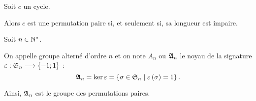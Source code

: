 \begin{ex}[Piège]
Soit \(c\) un cycle.

Alors \(c\) est une permutation paire si, et seulement si, sa longueur est impaire.
\end{ex}

\begin{defi}
Soit \(n\in\mathbb{N}^*\).

On appelle groupe alterné d'ordre \(n\) et on note \(A_n\) ou \(\frak{A}_{n}\) le noyau de la signature \(\varepsilon:\frak{S}_{n}\longrightarrow\left\lbrace-1;1\right\rbrace\) : \[\frak{A}_{n}=\ker\varepsilon=\left\lbrace\sigma\in\frak{S}_{n}\;\middle|\;\varepsilon\left(\sigma\right)=1\right\rbrace.\]

Ainsi, \(\frak{A}_{n}\) est le groupe des permutations paires.
\end{defi}